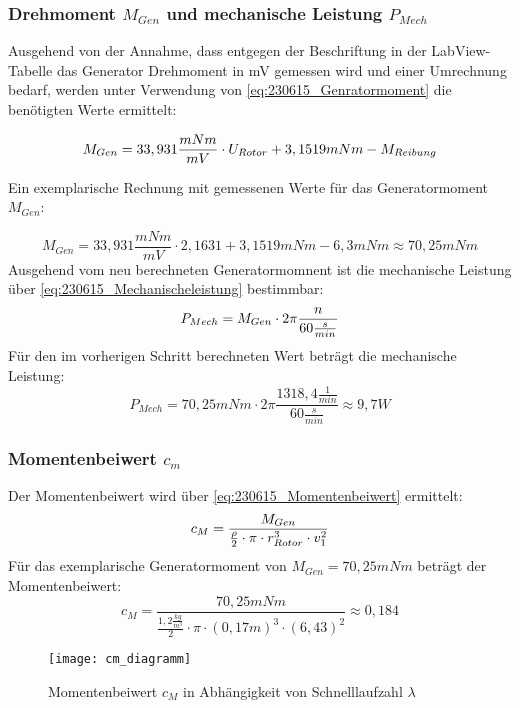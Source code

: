 \subsubsection*{Drehmoment $M_{Gen}$ und mechanische Leistung $P_{Mech}$}
Ausgehend von der Annahme,
 dass entgegen der Beschriftung in der LabView-Tabelle das Generator Drehmoment in mV gemessen wird und einer Umrechnung bedarf, 
 werden unter Verwendung von \autoref{eq:230615_Genratormoment} die benötigten Werte ermittelt:

\begin{equation}
    \centering
    M_{Gen} = 33,931\frac{mNm}{mV} \cdot U_{Rotor} + 3,1519 mNm - M_{Reibung}
    \label{eq:230615_Genratormoment}
\end{equation}

Ein exemplarische Rechnung mit gemessenen Werte für das Generatormoment $M_{Gen}$:

$$M_{Gen} = 33,931\frac{mNm}{mV} \cdot 2,1631 + 3,1519 mNm - 6,3mNm \approx 70,25 mNm$$
Ausgehend vom neu berechneten Generatormomnent ist die mechanische Leistung über \autoref{eq:230615_Mechanischeleistung} bestimmbar:
\begin{equation}
    \centering
    P_{Mech} = M_{Gen} \cdot 2 \pi \frac{n}{60\frac{s}{min}}
    \label{eq:230615_Mechanischeleistung}
\end{equation}
Für den im vorherigen Schritt berechneten Wert beträgt die mechanische Leistung: 
$$P_{Mech} = 70,25mNm \cdot 2 \pi \frac{1318,4 \frac{1}{min}}{60\frac{s}{min}} \approx 9,7W$$

\subsubsection*{Momentenbeiwert $c_m$}
Der Momentenbeiwert wird über \autoref{eq:230615_Momentenbeiwert} ermittelt:
\begin{equation}
    \centering
    c_M = \frac{M_{Gen}}{ \frac{\rho}{2} \cdot \pi \cdot r_{Rotor}^3 \cdot v_1^2}
    \label{eq:230615_Momentenbeiwert}
\end{equation}
Für das exemplarische Generatormoment von $M_{Gen} = 70,25mNm$ beträgt der Momentenbeiwert:
$$c_M = \frac{70,25mNm}{ \frac{1,2 \frac{kg}{m^3}}{2} \cdot \pi \cdot (0,17 m)^3 \cdot (6,43)^2}\approx 0,184$$

\begin{figure}[H]
    \centering
    \texttt{[image: cm\_diagramm]}
    \caption{Momentenbeiwert $c_M$ in Abhängigkeit von Schnelllaufzahl $\lambda$}
    \label{fig:Momentenbeiwert}
\end{figure}

